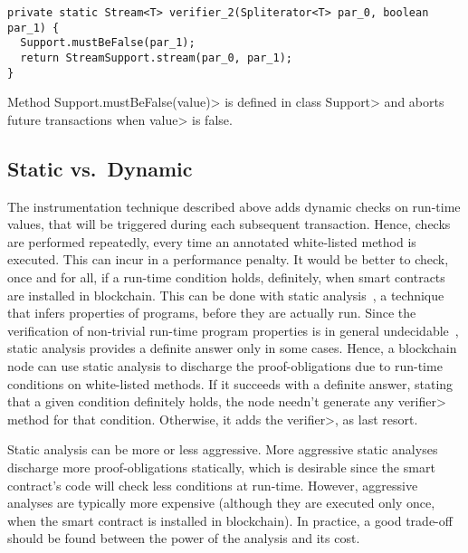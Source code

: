 {\small\begin{verbatim}
private static Stream<T> verifier_2(Spliterator<T> par_0, boolean par_1) {
  Support.mustBeFalse(par_1);
  return StreamSupport.stream(par_0, par_1);
}
\end{verbatim}}

\noindent
Method \<Support.mustBeFalse(value)> is defined in class \<Support> and
aborts future transactions when \<value> is false.



\subsection{Static vs.\ Dynamic}\label{subsec:static_vs_dynamic}

The instrumentation technique described above adds dynamic checks on run-time values,
that will be triggered during each subsequent transaction.
Hence, checks are performed repeatedly, every time an annotated white-listed method
is executed. This can incur in a performance penalty. It would be better
to check, once and for all,
if a run-time condition holds, definitely, when smart contracts
are installed in blockchain.
This can be done with static analysis~\cite{NielsonNH99}, a technique that infers
properties of programs, before they are actually run. Since the verification of
non-trivial run-time program properties is in general undecidable~\cite{Rice53},
static analysis provides a definite answer
only in some cases. Hence, a blockchain node can use static analysis to discharge
the proof-obligations due to run-time conditions on white-listed methods. If it
succeeds with a definite answer, stating that a given condition definitely holds,
the node needn't generate any \<verifier> method for that condition. Otherwise, it
adds the \<verifier>, as last resort.

Static analysis can be more or less aggressive.
More aggressive static analyses discharge more proof-obligations statically,
which is desirable since the smart contract's code will check less
conditions at run-time. However, aggressive analyses are typically more expensive
(although they are executed only once, when the smart contract is installed in
blockchain). In practice, a good trade-off should be found between the power of the analysis
and its cost.

